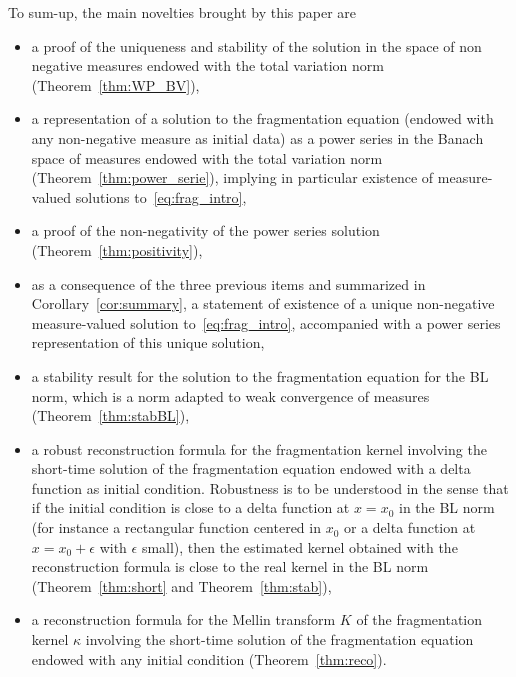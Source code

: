 \documentclass[10pt]{amsart}
\theoremstyle{definition}\newtheorem{defi}[theo]{Definition}\newtheorem{rema}[theo]{Remark}\newtheorem{exam}[theo]{Example}\newtheorem{exem}[theo]{Example}\newtheorem{nota}[theo]{Notation}
\begin{document}
To sum-up, the main novelties brought by this paper are
\begin{itemize}
\item a proof of the uniqueness and stability of the solution in the space of non negative measures endowed with the total variation norm (Theorem~\ref{thm:WP_BV}),
\item a representation of a solution to the fragmentation equation (endowed with any non-negative measure as initial data) as a power series in the Banach space of measures endowed with the total variation norm (Theorem~\ref{thm:power_serie}), implying in particular existence of measure-valued solutions to~\eqref{eq:frag_intro},
\item a proof of the non-negativity of the power series solution (Theorem~\ref{thm:positivity}),
\item as a consequence of the three previous items and summarized in Corollary~\ref{cor:summary}, a statement of existence of a unique non-negative measure-valued solution to~\eqref{eq:frag_intro}, accompanied with a power series representation of this unique solution,
\item a stability result for the solution to the fragmentation equation for the BL norm, which is a norm adapted to weak convergence of measures (Theorem~\ref{thm:stabBL}),
\item a robust reconstruction formula for the fragmentation kernel involving the short-time solution of the fragmentation equation endowed with a delta function as initial condition. Robustness is to be understood in the sense that if the initial condition is close to a delta function at $x=x_0$ in the BL norm (for instance a rectangular function centered in $x_0$ or a delta function at $x=x_0+\epsilon$ with $\epsilon$ small), then the estimated kernel obtained with the reconstruction formula is close to the real kernel in the BL norm (Theorem~\ref{thm:short} and Theorem~\ref{thm:stab}),
\item a reconstruction formula for the Mellin transform $K$ of the fragmentation kernel $\kappa$ involving the short-time solution of the fragmentation equation endowed with any initial condition (Theorem~\ref{thm:reco}).
\end{itemize}
\end{document}
